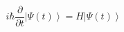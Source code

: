 \blindtext[4]

\begin{equation}
    i\hbar\frac{\partial}{\partial t}\left|\Psi(t)\right>=H\left|\Psi(t)\right>
\end{equation}

\blindtext \cite{}
